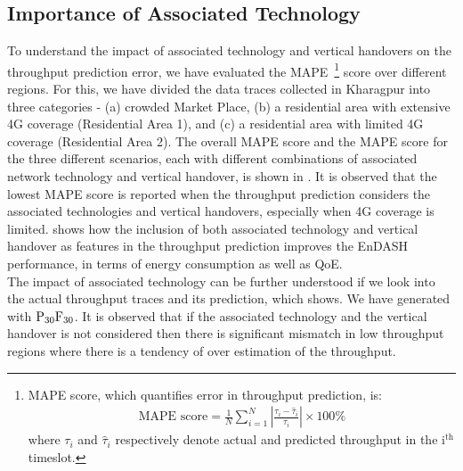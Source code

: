 \subsection{Importance of Associated Technology}
\indent To understand the impact of associated technology and vertical handovers on the throughput prediction error, we have evaluated the MAPE~\footnote{\indent MAPE score, which quantifies error in throughput prediction,  is:
\begin{align}
\text{MAPE\ score} = \frac{1}{N}\sum_{i=1}^N\left|\frac{\tau_i-\hat{\tau}_i}{\tau_i}\right|\times 100\%
\end{align}
where $\tau_i$ and $\hat{\tau}_i$ respectively denote actual and  predicted throughput in the $\mathrm{i^{th}}$ timeslot.
} score over different regions. For this, we have divided the data traces collected in Kharagpur into three categories - (a) crowded Market Place, (b) a residential area with extensive 4G coverage (Residential Area 1), and (c) a residential area with limited 4G coverage (Residential Area 2). The overall MAPE score and the MAPE score for the three different scenarios, each with different combinations of associated network technology and vertical handover, is shown in \fig{\ref{fig:chap04:MAPE_diff_scene}}. It is observed that the lowest MAPE score is reported when the throughput prediction considers the associated technologies and vertical handovers, especially when 4G coverage is limited. 
\fig{\ref{fig:chap04:Perf_VHO}} shows how the inclusion of both associated technology and vertical handover as features in the throughput prediction improves the EnDASH performance, in terms of energy consumption as well as \ac{QoE}.\\
\indent The impact of associated technology can be further understood if we look into the actual throughput traces and its prediction, which \fig{\ref{fig:chap04:thpt_pred_trace}} shows.
We have generated  \fig{\ref{fig:chap04:thpt_pred_trace}} with $\mathrm{P_{30}F_{30}}$.
It is observed that if the associated technology and the vertical handover is not considered then there is significant mismatch in low throughput regions where there is a tendency of over estimation of the throughput.
